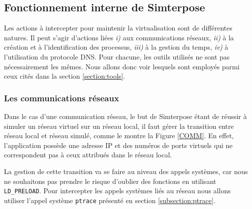 \subsection{Fonctionnement interne de Simterpose}
\label{subsection:fonctionnement_simterpose}

Les actions à intercepter pour maintenir la virtualisation sont de différentes
natures. Il peut s'agir d'actions liées \textit{i)} aux communications réseaux,
\textit{ii)} à la création et à l'identification des processus, \textit{iii)} à
la gestion du temps, \textit{iv)} à l'utilisation du protocole DNS. Pour chacune, les outils utilisés ne sont pas nécessairement les mêmes. Nous allons donc voir
lesquels sont employés parmi ceux cités dans la section
\ref{section:tools}.

\subsubsection{Les communications réseaux}
\label{subsubsection:fonctionnement_reseau}

Dans le cas d'une communication réseau, le but de Simterpose étant de réussir à
simuler un réseau virtuel sur un réseau local, il faut gérer la transition entre
réseau local et réseau simulé, comme le montre la Figure \ref{COMM}. En effet,
l'application possède une adresse IP et des numéros de ports virtuels qui ne
correspondent pas à ceux attribués dans le réseau local.

La gestion de cette transition va se faire au niveau des appels systèmes, car nous ne souhaitons pas prendre le risque d'oublier des fonctions en utilisant \texttt{LD\_PRELOAD}. Pour intercepter les appels systèmes liés au réseau nous allons utiliser l'appel système \texttt{ptrace} présenté en section \ref{subsection:ptrace}.


